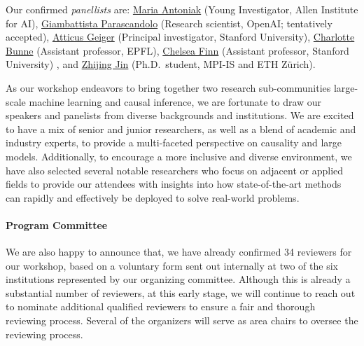 \documentclass{article}
\begin{document}
Our confirmed \textit{panellists} are:
\href{https://maria-antoniak.github.io/}{Maria Antoniak} (Young Investigator, Allen Institute for AI),
\href{https://sites.google.com/view/giambattista-parascandolo/home}{Giambattista Parascandolo} (Research scientist, OpenAI; tentatively accepted),
\href{https://atticusg.github.io/}{Atticus Geiger} (Principal investigator, Stanford University),
\href{https://www.bunnelab.com/}{Charlotte Bunne} (Assistant professor, EPFL),
\href{https://ai.stanford.edu/~cbfinn/}{Chelsea Finn} (Assistant professor, Stanford University) , and
\href{https://zhijing-jin.com/}{Zhijing Jin} (Ph.D.\ student, MPI-IS and ETH Zürich).


As our workshop endeavors to bring together two research sub-communities large-scale machine learning and causal inference, we are fortunate to draw our speakers and panelists from diverse backgrounds and institutions.
We are excited to have a mix of senior and junior researchers, as well as a blend of academic and industry experts, to provide a multi-faceted perspective on causality and large models.
Additionally, to encourage a more inclusive and diverse environment, we have also selected several notable researchers who focus on adjacent or applied fields to provide our attendees with insights into how state-of-the-art methods can rapidly and effectively be deployed to solve real-world problems.


\paragraph*{Program Committee}

We are also happy to announce that, we have already confirmed 34 reviewers for our workshop, based on a voluntary form sent out internally at two of the six institutions represented by our organizing committee. Although this is already a substantial number of reviewers, at this early stage, we will continue to reach out to nominate additional qualified reviewers 
to ensure a fair and thorough reviewing process.
Several of the organizers will serve as area chairs to oversee the reviewing process.


\end{document}
